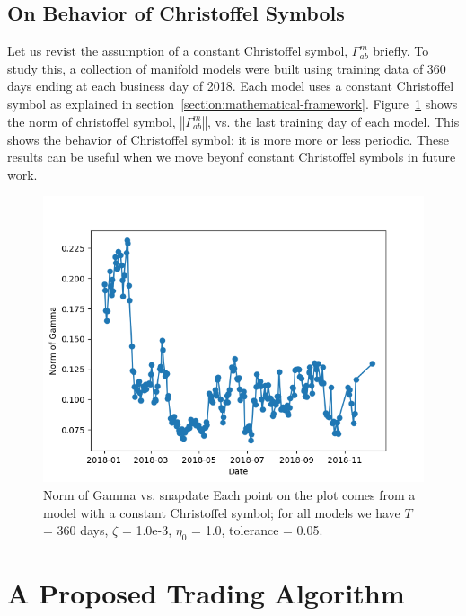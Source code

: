 \documentclass{article}
\begin{document}
\subsection{On Behavior of Christoffel Symbols}\label{subsection:christoffel-behavior}

Let us revist the assumption of a constant Christoffel symbol,
$\Gamma^{m}_{ab}$ briefly. To study this, a collection of manifold
models were built using training data of 360 days ending at each
business day of 2018. Each model uses a constant Christoffel symbol as
explained in
section~\ref{section:mathematical-framework}. Figure~\ref{fig:gamma-time}
shows the norm of christoffel symbol, $\left\Vert \Gamma^{m}_{ab}
\right\Vert$, vs. the last training day of each model. This shows the
behavior of Christoffel symbol; it is more more or less
periodic. These results can be useful when we move beyonf constant
Christoffel symbols in future work.

\begin{figure}\label{fig:gamma-time}
\includegraphics[bb=0 0 640 480]{figures/Gamma_time_2018.png}
\caption{Norm of Gamma vs. snapdate Each point on the plot comes from
  a model with a constant Christoffel symbol; for all models we have
  $T$ = 360 days, $\zeta$ = 1.0e-3, $\eta_{0}$ = 1.0, tolerance =
  0.05.}
\end{figure}

\section{A Proposed Trading Algorithm}\label{section:trading-algorithm}
\end{document}
